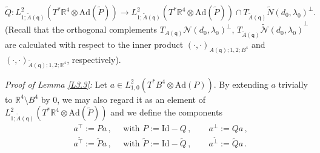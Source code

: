\documentclass[11pt]{article}
\numberwithin{equation}{section} \setlength{\topmargin}{-35pt}
\newcommand{\R}{\mathbb{R}}
\newcommand{\Ad}{\text{Ad}}
\newcommand{\q}{\mathsf{q}}
\newcommand{\ttilde}{\tilde{\intercal}}
\newcommand{\tperp}{\tilde{\perp}}
\begin{document}
\begin{equation}
\label{tpr1} \tilde Q :
L^2_{1;\tilde{A}(\q)}(T^{\ast}\R^4\otimes\Ad(\tilde{P}))\to
L^2_{1;\tilde{A}(\q)}(T^{\ast}\R^4\otimes\Ad(\tilde{P}))\cap
T_{\tilde{A}(\q)}\tilde{N}(d_0,\lambda_0)^{\perp}.
\end{equation}
(Recall that the orthogonal complements
$T_{A(\q)}{\mathcal{N}(d_0,\lambda_0)}^{\perp}$, $T_{\tilde
A(\q)}{\mathcal{\tilde N}(d_0,\lambda_0)}^{\perp}$ are calculated
with respect to the inner product $(\cdot,\cdot)_{A(\q);1,2;B^4}$
and $(\cdot,\cdot)_{\tilde{A}(\q);1,2;\R^4}$, respectively).

\medskip

\textit{Proof of Lemma \ref{L3.3}:} Let $a\in
L^2_{1,0}(T^{\ast}B^4\otimes\Ad(P))$. By extending $a$ trivially to
$\R^4\setminus B^4$ by $0$, we may also regard it as an element of
$L^2_{1;\tilde{A}(\q)}(T^{\ast}\R^4\otimes\Ad(\tilde{P}))$ and we
define the components
\begin{align}
\label{comp} &a^{\intercal}:=Pa\,,\quad \mbox{   with }
P:=\text{Id}-Q\,,\qquad
a^{\perp}:=Qa\,,\\
&a^{\ttilde}:=\tilde{P}a\,,\quad \mbox{   with } \tilde{P} :=
\text{Id}-\tilde{Q}\,,\qquad a^{\tperp}:=\tilde{Q}a\,.
\end{align}
\end{document}
